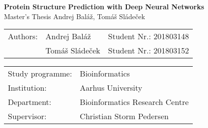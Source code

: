 \documentclass[11pt, twoside]{book}
\begin{document}
\frontmatter
\begin{titlepage}
    \begin{center}
        \vspace*{8cm}
        \Huge
            \textbf{Protein Structure Prediction with Deep Neural Networks}
        \vspace{0.5cm}\\
        \LARGE
            Master's Thesis
        \vfill
        \vspace{0.8cm}
        \Large
            Andrej Baláž, Tomáš Sládeček\\
    \end{center}
\end{titlepage}

\begin{center}

\vspace*{16cm}

\vfill

\end{center}

\vfill

\noindent
\begin{tabular}{lll}
Authors: & Andrej Baláž & Student Nr.: 201803148\\
 & Tomáš Sládeček & Student Nr.: 201803152
\end{tabular}

\noindent
\begin{tabular}{ll}
Study programme: & Bioinformatics \\
Institution: & Aarhus University \\
Department: & Bioinformatics Research Centre \\
Supervisor: & Christian Storm Pedersen \\
\end{tabular}

\vfill

\tableofcontents

\mainmatter






\backmatter
%
%
\printbibliography
\end{document}
